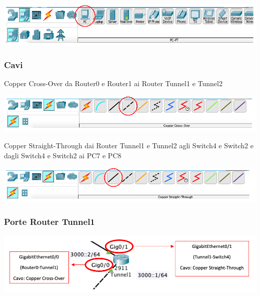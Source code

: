 \begin{center}
    \includegraphics[width=\linewidth]{images/07.routing-sicurezza/tunneling/03.png}
\end{center}

\subsubsection*{Cavi}
Copper Cross-Over da Router0 e Router1 ai Router Tunnel1 e Tunnel2

\begin{center}
    \includegraphics[width=\linewidth]{images/07.routing-sicurezza/tunneling/04.png}
\end{center}

\noindent Copper Straight-Through dai Router Tunnel1 e Tunnel2 agli Switch4 e Switch2 e dagli Switch4 e Switch2 ai PC7 e PC8

\begin{center}
    \includegraphics[width=\linewidth]{images/07.routing-sicurezza/tunneling/05.png}
\end{center}

\subsubsection*{Porte Router Tunnel1}

\begin{center}
    \includegraphics[width=\linewidth]{images/07.routing-sicurezza/tunneling/06.png}
\end{center}

